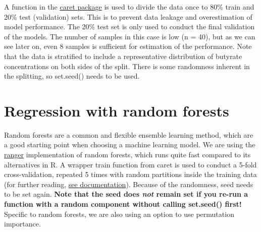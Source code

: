 \documentclass[
  oneside]{book}
\newenvironment{Shaded}{\begin{snugshade}}{\end{snugshade}}
\newcommand{\AttributeTok}[1]{\textcolor[rgb]{0.77,0.63,0.00}{#1}}
\newcommand{\ConstantTok}[1]{\textcolor[rgb]{0.00,0.00,0.00}{#1}}
\newcommand{\DecValTok}[1]{\textcolor[rgb]{0.00,0.00,0.81}{#1}}
\newcommand{\FunctionTok}[1]{\textcolor[rgb]{0.00,0.00,0.00}{#1}}
\newcommand{\NormalTok}[1]{#1}
\newcommand{\OtherTok}[1]{\textcolor[rgb]{0.56,0.35,0.01}{#1}}
\newcommand{\SpecialCharTok}[1]{\textcolor[rgb]{0.00,0.00,0.00}{#1}}
\begin{document}
A function in the \href{https://topepo.github.io/caret/}{caret package} is used to divide the data once to 80\% train and 20\% test (validation)
sets. This is to prevent data leakage and overestimation of model performance. The
20\% test set is only used to conduct the final validation of the models. The number of
samples in this case is low (n = 40), but as we can see later on, even 8 samples is
sufficient for estimation of the performance. Note that the data is stratified to include
a representative distribution of butyrate concentrations on both sides of the split.
There is some randomness inherent in the splitting, so set.seed() needs to be used.

\begin{Shaded}
\end{Shaded}

\hypertarget{regression-with-random-forests}{%
\section{Regression with random forests}\label{regression-with-random-forests}}

Random forests are a common and flexible ensemble learning method, which are a good starting
point when choosing a machine learning model. We are using the \href{https://github.com/imbs-hl/ranger}{ranger} implementation
of random forests, which runs quite fast compared to its alternatives in R. A wrapper
train function from caret is used to conduct a 5-fold cross-validation, repeated 5 times
with random partitions inside the training data (for further reading, \href{https://topepo.github.io/caret/model-training-and-tuning.html}{see documentation}).
Because of the randomness, seed needs to be set again. \textbf{Note that the seed does \emph{not} remain set if you re-run a function with a random component
without calling set.seed() first!} Specific to random forests, we are also using an option to use permutation
importance.
\end{document}
